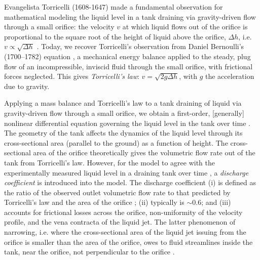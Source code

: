 \documentclass[openacc]{rsproca_new}%
\begin{document}

Evangelista Torricelli (1608-1647) made a fundamental observation for mathematical modeling the liquid level in a tank draining via gravity-driven flow through a small orifice: the velocity $v$ at which liquid flows out of the orifice is proportional to the square root of the height of liquid above the orifice, $\Delta h$, i.e. $v\propto \sqrt{\Delta h}$ \cite{mills1982newton}.
Today, we recover Torricelli's observation from Daniel Bernoulli's (1700–1782) equation \cite{welty2020fundamentals}, a mechanical energy balance applied to the steady, plug flow of an incompressible, inviscid fluid through the small orifice, with frictional forces neglected. This gives \emph{Torricelli's law}: $v=\sqrt{2 g \Delta h}$, with $g$ the acceleration due to gravity. \cite{d2021torricelli,teoman2022discharge}

Applying a mass balance and Torricelli's law to a tank draining of liquid via gravity-driven flow through a small orifice, we obtain a first-order, [generally] nonlinear differential equation governing the liquid level in the tank over time \cite{groetsch1993inverse,seborg2016process,debook}.
The geometry of the tank affects the dynamics of the liquid level through its cross-sectional area (parallel to the ground) as a function of height.
The cross-sectional area of the orifice theoretically gives the volumetric flow rate out of the tank from Torricelli's law. 
However, for the model to agree with the experimentally measured liquid level in a draining tank over time \cite{de2000pin,blasone2015discharge,wadhwa2021study,liu2008drainage}, a \emph{discharge coefficient} is introduced into the model. 
The discharge coefficient
(i) is defined as the ratio of the observed outlet volumetric flow rate to that predicted by Torricelli's law and the area of the orifice \cite{hicks2014determining};
(ii) typically is $\sim$0.6; and
(iii) accounts for frictional losses across the orifice, non-uniformity of the velocity profile, and the vena contracta of the liquid jet.
The latter phenomenon of narrowing, i.e. where the cross-sectional area of the liquid jet issuing from the orifice is smaller than the area of the orifice, owes to fluid streamlines inside the tank, near the orifice, not perpendicular to the orifice \cite{horsch2020simple}. 
\cite{teoman2022discharge,hicks2014determining,blasone2015discharge,lienhard1984velocity,wadhwa2021study}
\end{document}
